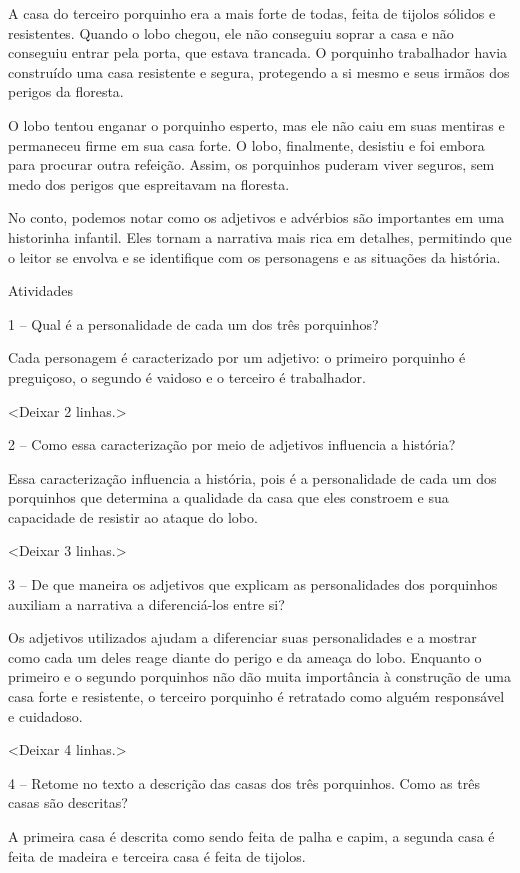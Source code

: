 A casa do terceiro porquinho era a mais forte de todas, feita de tijolos
sólidos e resistentes. Quando o lobo chegou, ele não conseguiu soprar a
casa e não conseguiu entrar pela porta, que estava trancada. O porquinho
trabalhador havia construído uma casa resistente e segura, protegendo a
si mesmo e seus irmãos dos perigos da floresta.

O lobo tentou enganar o porquinho esperto, mas ele não caiu em suas
mentiras e permaneceu firme em sua casa forte. O lobo, finalmente,
desistiu e foi embora para procurar outra refeição. Assim, os porquinhos
puderam viver seguros, sem medo dos perigos que espreitavam na floresta.

No conto, podemos notar como os adjetivos e advérbios são importantes em
uma historinha infantil. Eles tornam a narrativa mais rica em detalhes,
permitindo que o leitor se envolva e se identifique com os personagens e
as situações da história.

Atividades

1 -- Qual é a personalidade de cada um dos três porquinhos?

Cada personagem é caracterizado por um adjetivo: o primeiro porquinho é
preguiçoso, o segundo é vaidoso e o terceiro é trabalhador.

\textless{}Deixar 2 linhas.\textgreater{}

2 -- Como essa caracterização por meio de adjetivos influencia a
história?

Essa caracterização influencia a história, pois é a personalidade de
cada um dos porquinhos que determina a qualidade da casa que eles
constroem e sua capacidade de resistir ao ataque do lobo.

\textless{}Deixar 3 linhas.\textgreater{}

3 -- De que maneira os adjetivos que explicam as personalidades dos
porquinhos auxiliam a narrativa a diferenciá-los entre si?

Os adjetivos utilizados ajudam a diferenciar suas personalidades e a
mostrar como cada um deles reage diante do perigo e da ameaça do lobo.
Enquanto o primeiro e o segundo porquinhos não dão muita importância à
construção de uma casa forte e resistente, o terceiro porquinho é
retratado como alguém responsável e cuidadoso.

\textless{}Deixar 4 linhas.\textgreater{}

4 -- Retome no texto a descrição das casas dos três porquinhos. Como as
três casas são descritas?

A primeira casa é descrita como sendo feita de palha e capim, a segunda
casa é feita de madeira e terceira casa é feita de tijolos.

